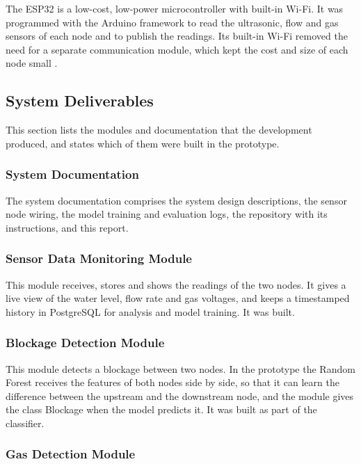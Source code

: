 \documentclass[12pt, a4paper]{article}
\begin{document}
The ESP32 is a low-cost, low-power microcontroller with built-in Wi-Fi. It was programmed with the Arduino framework to read the ultrasonic, flow and gas sensors of each node and to publish the readings. Its built-in Wi-Fi removed the need for a separate communication module, which kept the cost and size of each node small \citep{jayapriya2025}.

\subsection{System Deliverables}
\label{sec:deliverables}

This section lists the modules and documentation that the development produced, and states which of them were built in the prototype.

\subsubsection{System Documentation}

The system documentation comprises the system design descriptions, the sensor node wiring, the model training and evaluation logs, the repository with its instructions, and this report.

\subsubsection{Sensor Data Monitoring Module}

This module receives, stores and shows the readings of the two nodes. It gives a live view of the water level, flow rate and gas voltages, and keeps a timestamped history in PostgreSQL for analysis and model training. It was built.

\subsubsection{Blockage Detection Module}

This module detects a blockage between two nodes. In the prototype the Random Forest receives the features of both nodes side by side, so that it can learn the difference between the upstream and the downstream node, and the module gives the class Blockage when the model predicts it. It was built as part of the classifier.

\subsubsection{Gas Detection Module}
\end{document}
